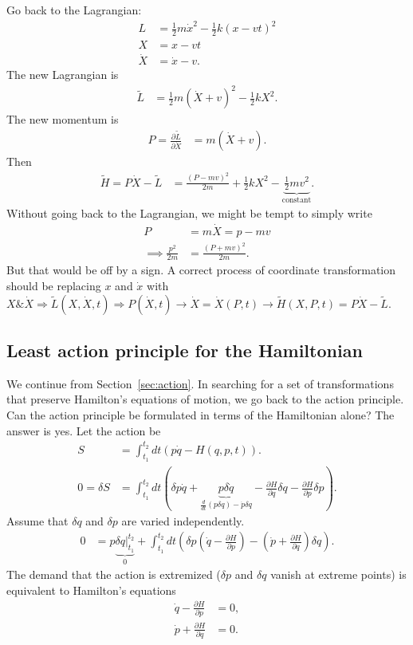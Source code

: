 Go back to the Lagrangian:
\begin{align}
L & =\frac{1}{2}m\dot{x}^{2}-\frac{1}{2}k(x-vt)^{2}\\
X & =x-vt\\
\dot{X} & =\dot{x}-v.
\end{align}
The new Lagrangian is
\begin{align}
\tilde{L} & =\frac{1}{2}m\left(\dot{X}+v\right)^{2}-\frac{1}{2}kX^{2}.
\end{align}
The new momentum is
\begin{align}
P=\frac{\partial\tilde{L}}{\partial\dot{X}} & =m\left(\dot{X}+v\right).
\end{align}
Then
\begin{align}
\tilde{H}=P\dot{X}-\tilde{L} & =\frac{\left(P-mv\right)^{2}}{2m}+\frac{1}{2}kX^{2}-\underbrace{\frac{1}{2}mv^{2}}_{\mbox{constant}}.
\end{align}
Without going back to the Lagrangian, we might be tempt to simply
write
\begin{align}
P & =m\dot{X}=p-mv\\
\implies\frac{p^{2}}{2m} & =\frac{\left(P+mv\right)^{2}}{2m}.
\end{align}
But that would be off by a sign. 
A correct process of coordinate transformation should be replacing $ x $ and $ \dot{x} $ with $ X\& \dot{X} \Rightarrow \tilde{L}(X,\dot{X},t) \Rightarrow P(\dot{X},t) \rightarrow \dot{X}=\dot{X}(P,t) \rightarrow \tilde{H}(X,P,t)=P\dot{X}-\tilde{L} $. 


\subsection{Least action principle for the Hamiltonian}


We continue from Section~\ref{sec:action}. In searching for a set of transformations that preserve Hamilton's equations of motion, we go back to the action principle. Can the action principle be formulated in terms of the Hamiltonian alone? The answer is yes. Let the action be
\begin{align}
S & =\int_{t_{1}}^{t_{2}}dt\left(p\dot{q}-H(q,p,t)\right).\\
0=\delta S & =\int_{t_{1}}^{t_{2}}dt\left(\delta p\dot{q}+\underbrace{p\delta\dot{q}}_{\frac{d}{dt}(p\delta q)-\dot{p}\delta q}-\frac{\partial H}{\partial q}\delta q-\frac{\partial H}{\partial p}\delta p\right).
\end{align}
Assume that $\delta q$ and $\delta p$ are varied independently.
\begin{align}
0 & =p\underbrace{\delta q\Big|_{t_{1}}^{t_{2}}}_{0}+\int_{t_{1}}^{t_{2}}dt\left(\delta p\left(\dot{q}-\frac{\partial H}{\partial p}\right)-\left(\dot{p}+\frac{\partial H}{\partial q}\right)\delta q\right).
\end{align}
The demand that the action is extremized ($ \delta p $ and $ \delta q $ vanish at extreme points) is equivalent to Hamilton's
equations
\begin{align}
\dot{q}-\frac{\partial H}{\partial p} & =0,\\
\dot{p}+\frac{\partial H}{\partial q} & =0.
\end{align}

